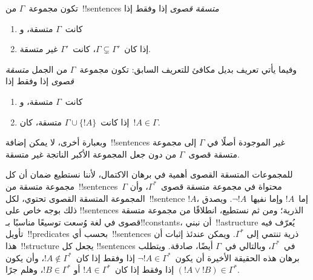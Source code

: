 \documentclass[../../../include/open-logic-section]{subfiles}
\begin{document}

\begin{defn}
تكون مجموعة~$\Gamma$ من~!!{sentence}s 
\emph{متسقة قصوى} إذا وفقط إذا
\begin{enumerate}
\item كانت~$\Gamma$ متسقة، و
\item إذا كان~$\Gamma \subsetneq \Gamma'$، كانت~$\Gamma'$ غير متسقة.
\end{enumerate}
\end{defn}

\begin{explain}
وفيما يأتي تعريف بديل مكافئ للتعريف السابق: تكون مجموعة~$\Gamma$ من
الجمل \emph{متسقة قصوى} إذا وفقط إذا
\begin{enumerate}
\item كانت~$\Gamma$ متسقة، و
\item إذا كانت~$\Gamma \cup \{ !A \}$ متسقة، كان~$!A \in \Gamma$.
\end{enumerate}
وبعبارة أخرى، لا يمكن إضافة~!!{sentence}s غير الموجودة أصلًا في
$\Gamma$ إلى مجموعة متسقة قصوى~$\Gamma$ من دون جعل المجموعة الأكبر
الناتجة غير متسقة.
\end{explain}

\begin{explain}
للمجموعات المتسقة القصوى أهمية في برهان الاكتمال، لأننا نستطيع ضمان
أن كل مجموعة متسقة من~!!{sentence}s~$\Gamma$ محتواة في مجموعة متسقة
قصوى~$\Gamma^*$، وأن المجموعة المتسقة القصوى تحتوي، لكل~!!{sentence}
$!A$، إما~$!A$ وإما نفيها~$\lnot !A$. ويصدق ذلك بوجه خاص على
!!{sentence}s الذرية؛ ومن ثم نستطيع، انطلاقًا من مجموعة متسقة قصوى في
لغة وُسعت توسيعًا مناسبًا بـ!!{constant}s، أن نبني~!!a{structure}
يُعرّف فيه تأويل~!!{predicate}s بحسب أي~!!{sentence}s ذرية تنتمي إلى
$\Gamma^*$. ويمكن عندئذ إثبات أن هذا~!!{structure} يجعل كل
!!{sentence}s في~$\Gamma^*$، وبالتالي في~$\Gamma$ أيضًا، صادقة. ويتطلب
برهان هذه الحقيقة الأخيرة أن يكون~$\lnot !A \in \Gamma^*$ إذا وفقط
إذا كان~$!A \notin \Gamma^*$، وأن يكون
$(!A \lor !B) \in \Gamma^*$ إذا وفقط إذا كان~$!A \in \Gamma^*$ أو
$!B \in \Gamma^*$، وهلم جرًا.
\end{explain}
\end{document}
